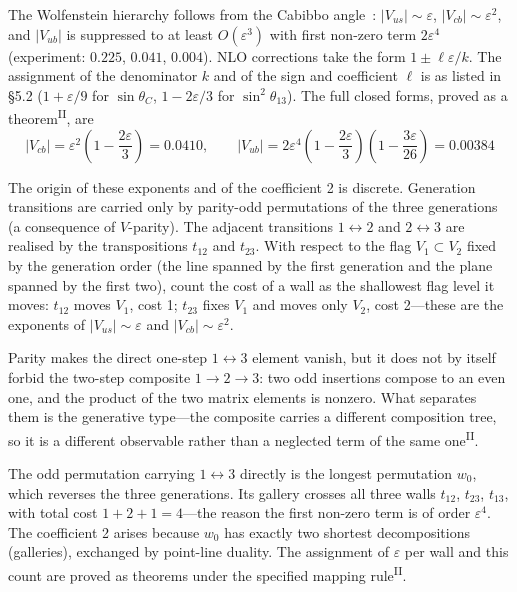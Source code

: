 \documentclass[12pt,a4paper]{article}
\newcommand{\PII}{\textsuperscript{\textup{II}}}
\begin{document}
The Wolfenstein hierarchy follows from the Cabibbo angle~\cite{wolfenstein}: $|V_{us}| \sim \varepsilon$, $|V_{cb}| \sim \varepsilon^2$, and $|V_{ub}|$ is suppressed to at least $O(\varepsilon^3)$ with first non-zero term $2\varepsilon^4$ (experiment: $0.225$, $0.041$, $0.004$).
NLO corrections take the form $1 \pm \ell\varepsilon/k$. The assignment
of the denominator $k$ and of the sign and coefficient $\ell$ is as
listed in \S5.2 ($1+\varepsilon/9$ for $\sin\theta_C$,
$1-2\varepsilon/3$ for $\sin^2\!\theta_{13}$).
The full closed forms, proved as a theorem\PII{}, are
\begin{equation}
|V_{cb}| = \varepsilon^2\left(1-\frac{2\varepsilon}{3}\right) = 0.0410,\qquad
|V_{ub}| = 2\varepsilon^4\left(1-\frac{2\varepsilon}{3}\right)\left(1-\frac{3\varepsilon}{26}\right) = 0.00384
\end{equation}

The origin of these exponents and of the coefficient 2 is discrete. Generation transitions are carried only by parity-odd permutations of the three generations (a consequence of $V$-parity). The adjacent transitions $1\leftrightarrow2$ and $2\leftrightarrow3$ are realised by the transpositions $t_{12}$ and $t_{23}$. With respect to the flag $V_1 \subset V_2$ fixed by the generation order (the line spanned by the first generation and the plane spanned by the first two), count the cost of a wall as the shallowest flag level it moves: $t_{12}$ moves $V_1$, cost 1; $t_{23}$ fixes $V_1$ and moves only $V_2$, cost 2---these are the exponents of $|V_{us}| \sim \varepsilon$ and $|V_{cb}| \sim \varepsilon^2$.

Parity makes the direct one-step $1 \leftrightarrow 3$ element vanish, but it does not by itself forbid the two-step composite $1 \to 2 \to 3$: two odd insertions compose to an even one, and the product of the two matrix elements is nonzero. What separates them is the generative type---the composite carries a different composition tree, so it is a different observable rather than a neglected term of the same one\PII{}.

The odd permutation carrying $1 \leftrightarrow 3$ directly is the longest permutation $w_0$, which reverses the three generations. Its gallery crosses all three walls $t_{12}$, $t_{23}$, $t_{13}$, with total cost $1 + 2 + 1 = 4$---the reason the first non-zero term is of order $\varepsilon^4$. The coefficient 2 arises because $w_0$ has exactly two shortest decompositions (galleries), exchanged by point-line duality. The assignment of $\varepsilon$ per wall and this count are proved as theorems under the specified mapping rule\PII{}.
\end{document}
